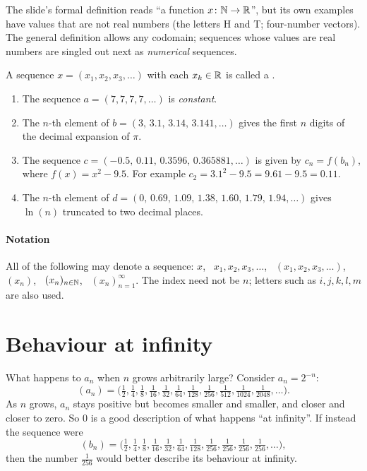 \begin{sourcenote}
The slide's formal definition reads ``a function $x\colon\mathbb{N}\to\mathbb{R}$'', but its own examples have values that are not real
numbers (the letters H and T; four-number vectors). The general definition allows any codomain; sequences whose values
are real numbers are singled out next as \emph{numerical} sequences.
\end{sourcenote}

\begin{definition}
A sequence $x=(x_1,x_2,x_3,\dots)$ with each $x_k\in\mathbb{R}$ is called a . 
\end{definition}

\begin{example}
\begin{enumerate}
  \item The sequence $a=(7,7,7,7,\dots)$ is \emph{constant}.
  \item The $n$-th element of $b=(3,\,3.1,\,3.14,\,3.141,\dots)$ gives the first $n$ digits of the decimal expansion of $\pi$.
  \item The sequence $c=(-0.5,\,0.11,\,0.3596,\,0.365881,\dots)$ is given by $c_n=f(b_n)$, where $f(x)=x^2-9.5$. For example
  $c_2=3.1^2-9.5=9.61-9.5=0.11$.
  \item The $n$-th element of $d=(0,\,0.69,\,1.09,\,1.38,\,1.60,\,1.79,\,1.94,\dots)$ gives $\ln(n)$ truncated to two decimal
  places.
\end{enumerate}
\end{example}

\paragraph{Notation} All of the following may denote a sequence:
$x$, \ $x_1,x_2,x_3,\dots$, \ $(x_1,x_2,x_3,\dots)$, \ $(x_n)$, \ $(x_n)_{n\in\mathbb{N}}$, \ $(x_n)_{n=1}^{\infty}$.
The index need not be $n$; letters such as $i,j,k,l,m$ are also used. 

\section{Behaviour at infinity}\label{sec:at-infinity}

What happens to $a_n$ when $n$ grows arbitrarily large? Consider $a_n=2^{-n}$:
\[
(a_n)=\Big(\tfrac12,\tfrac14,\tfrac18,\tfrac1{16},\tfrac1{32},\tfrac1{64},\tfrac1{128},\tfrac1{256},\tfrac1{512},\tfrac1{1024},\tfrac1{2048},\dots\Big).
\]
As $n$ grows, $a_n$ stays positive but becomes smaller and smaller, and closer and closer to zero. So $0$ is a good
description of what happens ``at infinity''. If instead the sequence were
\[
(b_n)=\Big(\tfrac12,\tfrac14,\tfrac18,\tfrac1{16},\tfrac1{32},\tfrac1{64},\tfrac1{128},\tfrac1{256},\tfrac1{256},\tfrac1{256},\tfrac1{256},\dots\Big),
\]
then the number $\tfrac1{256}$ would better describe its behaviour at infinity. 

